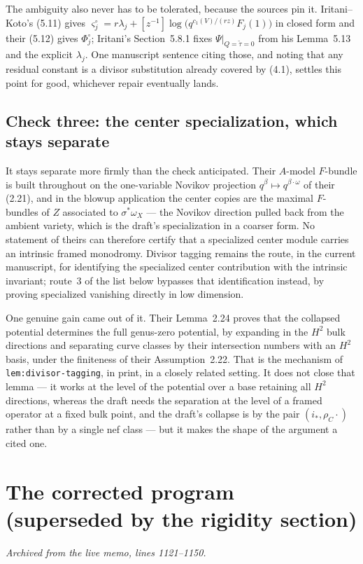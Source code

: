 \documentclass[11pt]{article}
\theoremstyle{definition}
\theoremstyle{remark}
\begin{document}
The ambiguity also never has to be tolerated, because the sources pin it.
Iritani--Koto's (5.11) gives
$\varsigma_j^\circ=r\lambda_j+[z^{-1}]\log\bigl(q^{c_1(V)/(rz)}F_j(1)\bigr)$ in
closed form and their (5.12) gives $\Phi_j^\circ$; Iritani's Section~5.8.1 fixes
$\Psi|_{Q=\widetilde\tau=0}$ from his Lemma~5.13 and the explicit $\lambda_j$.
One manuscript sentence citing those, and noting that any residual constant is a
divisor substitution already covered by (4.1), settles this point for good,
whichever repair eventually lands.

\subsection*{Check three: the center specialization, which stays separate}

It stays separate more firmly than the check anticipated. Their $A$-model
$F$-bundle is built throughout on the one-variable Novikov projection
$q^\beta\mapsto q^{\beta\cdot\omega}$ of their (2.21), and in the blowup
application the center copies are the maximal $F$-bundles of $Z$ associated to
$\sigma^*\omega_X$ --- the Novikov direction pulled back from the ambient
variety, which is the draft's specialization in a coarser form. No statement of
theirs can therefore certify that a specialized center module carries an
intrinsic framed monodromy. Divisor tagging remains the route, in the current
manuscript, for identifying the specialized center contribution with the
intrinsic invariant; route~3 of the list below bypasses that identification
instead, by proving specialized vanishing directly in low dimension.

One genuine gain came out of it. Their Lemma~2.24 proves that the collapsed
potential determines the full genus-zero potential, by expanding in the $H^2$
bulk directions and separating curve classes by their intersection numbers with
an $H^2$ basis, under the finiteness of their Assumption~2.22. That is the
mechanism of \texttt{lem:divisor-tagging}, in print, in a closely related
setting. It does not close that lemma --- it works at the level of the potential
over a base retaining all $H^2$ directions, whereas the draft needs the
separation at the level of a framed operator at a fixed bulk point, and the
draft's collapse is by the pair $(i_*,\rho_C\cdot)$ rather than by a single nef
class --- but it makes the shape of the argument a cited one.


\section{The corrected program (superseded by the rigidity section)}
\noindent\emph{Archived from the live memo, lines 1121--1150.}
\end{document}
